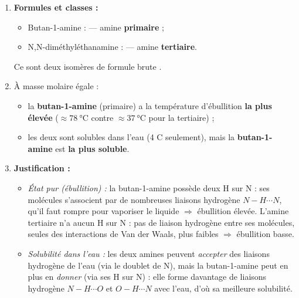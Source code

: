 \documentclass[11pt]{article}
\begin{document}
\begin{corrige}
\begin{enumerate}
\item \textbf{Formules et classes :}
\begin{itemize}
\item Butan-1-amine :  — amine \textbf{primaire} ;
\item N,N-diméthyléthanamine :  — amine \textbf{tertiaire}.
\end{itemize}
Ce sont deux isomères de formule brute .
\item À masse molaire égale :
\begin{itemize}
\item la \textbf{butan-1-amine} (primaire) a la température d'ébullition \textbf{la plus élevée} ($\approx \SI{78}{\celsius}$ contre $\approx \SI{37}{\celsius}$ pour la tertiaire) ;
\item les deux sont solubles dans l'eau (4 C seulement), mais la \textbf{butan-1-amine} est \textbf{la plus soluble}.
\end{itemize}
\item \textbf{Justification :}
\begin{itemize}
\item \emph{État pur (ébullition) :} la butan-1-amine possède deux H sur N : ses molécules s'associent par de nombreuses liaisons hydrogène $N-H\cdots N$, qu'il faut rompre pour vaporiser le liquide $\Rightarrow$ ébullition élevée. L'amine tertiaire n'a aucun H sur N : pas de liaison hydrogène entre ses molécules, seules des interactions de Van der Waals, plus faibles $\Rightarrow$ ébullition basse.
\item \emph{Solubilité dans l'eau :} les deux amines peuvent \emph{accepter} des liaisons hydrogène de l'eau (via le doublet de N), mais la butan-1-amine peut en plus en \emph{donner} (via ses H sur N) : elle forme davantage de liaisons hydrogène $N-H\cdots O$ et $O-H\cdots N$ avec l'eau, d'où sa meilleure solubilité.
\end{itemize}
\end{enumerate}
\end{corrige}
\end{document}

